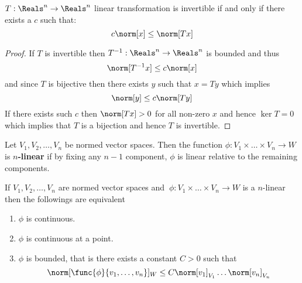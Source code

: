 \begin{theorem}
    \(T : \Reals^n \to \Reals^n\) linear transformation is invertible if and only if there exists a \(c\) such that:
    \begin{equation*}
        c \norm[x] \leq \norm[Tx]
    \end{equation*}
\end{theorem}

\begin{proof}
    If \(T\) is invertible then \(T^{-1} : \Reals^n \to \Reals^n \) is bounded and thus
    \begin{equation*}
        \norm[T^{-1}x] \leq c \norm[x]
    \end{equation*}
    and since \(T\) is bijective then there exists \(y\) such that \(x = Ty\) which implies
    \begin{equation*}
        \norm[y] \leq c\norm[Ty]
    \end{equation*}
    If there exists such \(c\) then \(\norm[Tx] > 0\) for all non-zero \(x\) and hence \(\ker T  = 0\) which implies that \(T\) is a bijection and hence \(T\) is invertible.
\end{proof}

\begin{definition}
    Let \(V_1, V_2 ,\dots , V_n\) be  normed vector spaces. Then the function \(\phi : V_1 \times \dots \times V_n \to W\) is \textbf{\(n\)-linear} if by fixing any \(n-1\) component, \(\phi\) is linear relative to the remaining components.
\end{definition}

\begin{proposition}
    If \(V_1, V_2, \dots , V_n\) are  normed vector spaces and \(\ \phi : V_1 \times \dots \times V_n \to W \) is a \(n\)-linear then the followings are equivalent
    \begin{enumerate}
        \item \(\phi\) is continuous. \label{it:continuityOfnLinear}
        \item \(\phi\) is continuous at a point. \label{it:continuityOfnLinearataPoint}
        \item \(\phi\) is bounded, that is there exists a constant \(C > 0\) such that \label{it:boundednessOfnLinear}
              \begin{equation*}
                  \norm[\func{\phi}{v_1, \dots ,v_n}]_W \leq C \norm[v_1]_{V_1} \dots \norm[v_n]_{V_n}
              \end{equation*}
    \end{enumerate}
\end{proposition}


